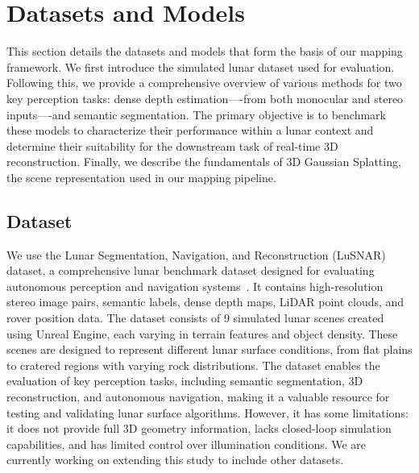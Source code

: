 \section{Datasets and Models}
\label{sec:datasets_and_models}
This section details the datasets and models that form the basis of our mapping framework. We first introduce the simulated lunar dataset used for evaluation. Following this, we provide a comprehensive overview of various methods for two key perception tasks: dense depth estimation—-from both monocular and stereo inputs—-and semantic segmentation. The primary objective is to benchmark these models to characterize their performance within a lunar context and determine their suitability for the downstream task of real-time 3D reconstruction. Finally, we describe the fundamentals of 3D Gaussian Splatting, the scene representation used in our mapping pipeline.

\subsection{Dataset}
We use the Lunar Segmentation, Navigation, and Reconstruction (LuSNAR) dataset, a comprehensive lunar benchmark dataset designed for evaluating autonomous perception and navigation systems~\cite{liu_lusnarlunar_2024}. It contains high-resolution stereo image pairs, semantic labels, dense depth maps, LiDAR point clouds, and rover position data. The dataset consists of 9 simulated lunar scenes created using Unreal Engine, each varying in terrain features and object density. These scenes are designed to represent different lunar surface conditions, from flat plains to cratered regions with varying rock distributions. The dataset enables the evaluation of key perception tasks, including semantic segmentation, 3D reconstruction, and autonomous navigation, making it a valuable resource for testing and validating lunar surface algorithms. However, it has some limitations: it does not provide full 3D geometry information, lacks closed-loop simulation capabilities, and has limited control over illumination conditions.
We are currently working on extending this study to include other datasets.

